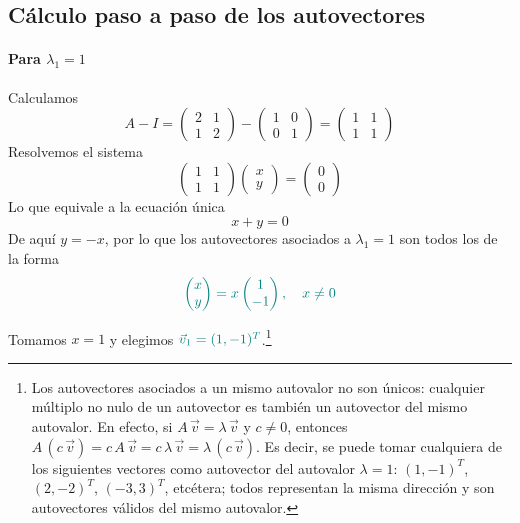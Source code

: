 \documentclass{article}
\newcommand{\vect}[1]{\vec{#1}}
\begin{document}
\subsection*{Cálculo paso a paso de los autovectores}

\paragraph*{Para \(\lambda_1 = 1\)}
Calculamos
\[
A - I = \begin{pmatrix}
 2 & 1\\
 1 & 2
\end{pmatrix}
- \begin{pmatrix}
 1 & 0\\
 0 & 1
\end{pmatrix}
= \begin{pmatrix}
 1 & 1\\
 1 & 1
\end{pmatrix}
\]
Resolvemos el sistema
\[
\begin{pmatrix}
 1 & 1\\
 1 & 1
\end{pmatrix}
\begin{pmatrix}x\\y\end{pmatrix}
= \begin{pmatrix}0\\0\end{pmatrix}
\]
Lo que equivale a la ecuación única
\[
x + y = 0
\]
De aquí \(y = -x\), por lo que los autovectores asociados a \(\lambda_1=1\) son todos los de la forma
\[ \color{teal}
\begin{pmatrix}x\\y\end{pmatrix}
= x\begin{pmatrix}1\\-1\end{pmatrix},
\quad x\neq 0
\]

Tomamos \(x=1\) y elegimos \(\color{teal}\vect{v}_1 = (1,-1)^T\).\footnote{Los autovectores asociados a un mismo autovalor no son únicos: cualquier múltiplo no nulo de un autovector es también un autovector del mismo autovalor. En efecto, si \(A\,\vect{v}=\lambda\,\vect{v}\) y \(c\neq 0\), entonces \(A\,(c\,\vect{v})=c\,A\,\vect{v}=c\,\lambda\,\vect{v}=\lambda\,(c\,\vect{v})\). Es decir, se puede tomar cualquiera de los siguientes vectores como autovector del autovalor \(\lambda=1\): \((1,-1)^T\), \((2,-2)^T\), \((-3,3)^T\), etcétera; todos representan la misma dirección y son autovectores válidos del mismo autovalor.}
\end{document}

